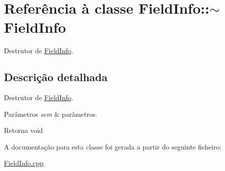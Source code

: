\hypertarget{class_field_info_1_1~_field_info}{}\section{Referência à classe Field\+Info\+:\+:$\sim$\+Field\+Info}
\label{class_field_info_1_1~_field_info}


Destrutor de \hyperlink{class_field_info}{Field\+Info}.  




\subsection{Descrição detalhada}
Destrutor de \hyperlink{class_field_info}{Field\+Info}. 


\begin{DoxyParams}{Parâmetros}
{\em sem} & parâmetros. \\
\hline
\end{DoxyParams}
\begin{DoxyReturn}{Retorna}
void 
\end{DoxyReturn}


A documentação para esta classe foi gerada a partir do seguinte ficheiro\+:\begin{DoxyCompactItemize}
\item 
\hyperlink{_field_info_8cpp}{Field\+Info.\+cpp}\end{DoxyCompactItemize}
